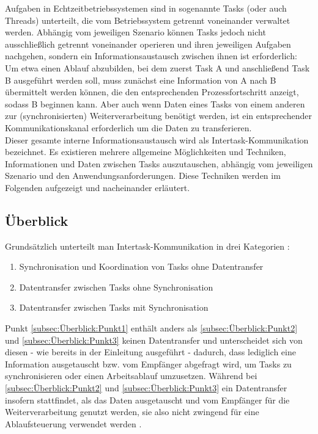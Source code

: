 \documentclass{llncs}
\begin{document}
Aufgaben in Echtzeitbetriebssystemen sind in sogenannte Tasks (oder auch Threads) unterteilt, die vom Betriebssystem getrennt voneinander verwaltet werden. Abhängig vom jeweiligen Szenario können Tasks jedoch nicht ausschließlich getrennt voneinander operieren und ihren jeweiligen Aufgaben nachgehen, sondern ein Informationsaustausch zwischen ihnen ist erforderlich: Um etwa einen Ablauf abzubilden, bei dem zuerst Task A und anschließend Task B ausgeführt werden soll, muss zunächst eine Information von A nach B übermittelt werden können, die den entsprechenden Prozessfortschritt anzeigt, sodass B beginnen kann. Aber auch wenn Daten eines Tasks von einem anderen zur (synchronisierten) Weiterverarbeitung benötigt werden, ist ein entsprechender Kommunikationskanal erforderlich um die Daten zu transferieren.\\

Dieser gesamte interne Informationsaustausch wird als Intertask-Kommunikation bezeichnet. Es existieren mehrere allgemeine Möglichkeiten und Techniken, Informationen und Daten zwischen Tasks auszutauschen, abhängig vom jeweiligen Szenario und den Anwendungsanforderungen. Diese Techniken werden im Folgenden aufgezeigt und nacheinander erläutert.

\subsection{Überblick}
\label{subsec:Überblick}
Grundsätzlich unterteilt man Intertask-Kommunikation in drei Kategorien \autocite[vgl.][79]{Cooling2017}:
\begin{enumerate}
	\setlength\itemsep{0.5em} %
	\item {Synchronisation und Koordination von Tasks ohne Datentransfer \label{subsec:Überblick:Punkt1}}
	\item {Datentransfer zwischen Tasks ohne Synchronisation \label{subsec:Überblick:Punkt2}}
	\item {Datentransfer zwischen Tasks mit Synchronisation \label{subsec:Überblick:Punkt3}}
\end{enumerate}
Punkt \ref{subsec:Überblick:Punkt1} enthält anders als \ref{subsec:Überblick:Punkt2} und \ref{subsec:Überblick:Punkt3} keinen Datentransfer und unterscheidet sich von diesen - wie bereits in der Einleitung ausgeführt - dadurch, dass lediglich eine Information ausgetauscht bzw. vom Empfänger abgefragt wird, um Tasks zu synchronisieren oder einen Arbeitsablauf umzusetzen. Während bei \ref{subsec:Überblick:Punkt2} und \ref{subsec:Überblick:Punkt3} ein Datentransfer insofern stattfindet, als das Daten ausgetauscht und vom Empfänger für die Weiterverarbeitung genutzt werden, sie also nicht zwingend für eine Ablaufsteuerung verwendet werden \autocite[vgl.][80]{Cooling2017}.
\end{document}
